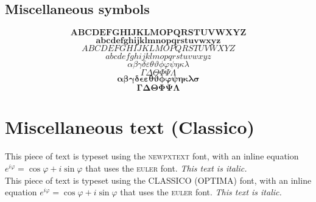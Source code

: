 \documentclass[b5paper]{scrbook}
\begin{document}
\subsection{Miscellaneous symbols}
\begin{equation}
\boldsymbol{ABCDEFGHIJKLMOPQRSTUVWXYZ}
\end{equation} \begin{equation}
\boldsymbol{abcdefghijklmnopqrstuvwxyz}
\end{equation} \begin{equation}
ABCDEFGHIJKLMOPQRSTUVWXYZ
\end{equation} \begin{equation}
abcdefghijklmopqrstuvwxyz
\end{equation} \begin{equation}
\alpha\beta\gamma\delta\varepsilon\theta\vartheta\phi\varphi\psi\eta\kappa\lambda
\end{equation} \begin{equation}
\Gamma\Delta\Theta\Phi\Psi\Lambda
\end{equation} \begin{equation}
\boldsymbol{\alpha\beta\gamma\delta\epsilon\varepsilon\theta\vartheta\phi\varphi\psi\eta\kappa\lambda\sigma}
\end{equation} \begin{equation}
\boldsymbol{\Gamma\Delta\Theta\Phi\Psi\Lambda}
\end{equation}

\section{Miscellaneous text (Classico)}
This piece of text is typeset using the \textsc{newpxtext} font, with an inline equation $e^{i\varphi} = \cos\varphi + i\sin\varphi$ that uses the \textsc{euler} font. \emph{This text is italic.}\\[1ex]
\textsf{This piece of text is typeset using the CLASSICO (OPTIMA) font, with an inline equation $e^{i\varphi} = \cos\varphi + i\sin\varphi$ that uses the \textsc{euler} font. \textit{This text is italic.}}
\end{document}
